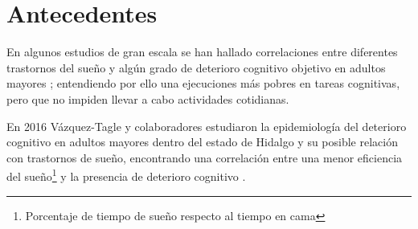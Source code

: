 

\section{Antecedentes}

En algunos estudios de gran escala se han hallado correlaciones entre diferentes trastornos del 
sueño y algún grado de deterioro cognitivo objetivo en adultos mayores 
\cite{Amer13,Miyata13,Reid06,Potvin12}; entendiendo por ello una ejecuciones más pobres en tareas
cognitivas, pero que no impiden llevar a cabo actividades cotidianas.

En 2016 Vázquez-Tagle y colaboradores estudiaron la epidemiología del deterioro cognitivo en 
adultos mayores dentro del estado de Hidalgo y su posible relación con trastornos de sueño, 
encontrando una correlación entre una menor eficiencia del sueño\footnote{Porcentaje de tiempo
de sueño respecto al tiempo en cama} y la presencia de deterioro cognitivo \cite{VazquezTagle16}.

